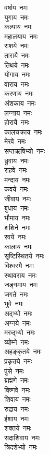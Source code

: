 \begin{multicols}{2}
\begin{flushleft}
वर्षाय~नमः\\
युगाय~नमः\\
कल्पाय~नमः\\
महालयाय~नमः\\
राशये~नमः\\
तारायै~नमः\hfill{}\\
तिथये~नमः\\
योगाय~नमः\\
वाराय~नमः\\
करणाय~नमः\\
अंशकाय~नमः\\
लग्नाय~नमः\\
होरायै~नमः\\
कालचक्राय~नमः\\
मेरवे~नमः\\
सप्तऋषिभ्यो~नमः\hfill{}\\
ध्रुवाय~नमः\\
राहवे~नमः\\
मन्दाय~नमः\\
कवये~नमः\\
जीवाय~नमः\\
बुधाय~नमः\\
भौमाय~नमः\\
शशिने~नमः\\
रवये~नमः\\
कालाय~नमः\hfill{}\\
सृष्टिस्थितये~नमः\\
विश्वस्मै~नमः\\
स्थावराय~नमः\\
जङ्गमाय~नमः\\
जगते~नमः\\
भुवे~नमः\\
अद्भ्यो~नमः\\
अग्नये~नमः\\
मरुद्भ्यो~नमः\\
व्योम्ने~नमः\hfill{}\\
अहङ्कृतये~नमः\\
प्रकृतये~नमः\\
पुंसे~नमः\\
ब्रह्मणे~नमः\\
विष्णवे~नमः\\
शिवाय~नमः\\
रुद्राय~नमः\\
ईशाय~नमः\\
शक्तये~नमः\\
सदाशिवाय~नमः\hfill{}\\
त्रिदशेभ्यो~नमः\\

\end{flushleft}
\end{multicols}
